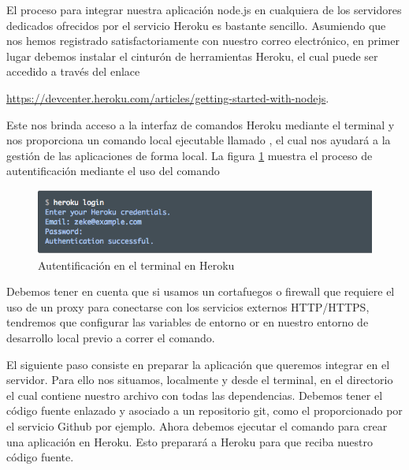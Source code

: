 
\pagestyle{fancy}
\fancyhead[LE,RO]{\thepage}
\fancyhead[LO]{\nouppercase{\rightmark}}
   
   El proceso para integrar nuestra aplicación node.js en cualquiera de los servidores dedicados ofrecidos por el servicio Heroku es bastante sencillo. Asumiendo que nos hemos registrado satisfactoriamente con nuestro correo electrónico, en primer lugar debemos instalar el cinturón de herramientas Heroku, el cual puede ser accedido a través del enlace
   
   \mbox{\url{https://devcenter.heroku.com/articles/getting-started-with-nodejs}}.
    
   Este nos brinda acceso a la interfaz de comandos Heroku mediante el terminal y nos proporciona un comando local ejecutable llamado , el cual nos ayudará a la gestión de las aplicaciones de forma local.
   La figura \ref{fig:authentication} muestra el proceso de autentificación mediante el uso del comando 

 \begin{figure}[H] \centering
    \includegraphics[width=15cm]{graphs/herokuLogin.png} \caption{Autentificación en el terminal en Heroku \cite{heroku}}\label{fig:authentication}
\end{figure}

Debemos tener en cuenta que si usamos un cortafuegos o firewall que requiere el uso de un proxy para conectarse con los servicios externos HTTP/HTTPS, tendremos que configurar las variables de entorno  or  en nuestro entorno de desarrollo local previo a correr el comando.

El siguiente paso consiste en preparar la aplicación que queremos integrar en el servidor. Para ello nos situamos, localmente y desde el terminal, en el directorio el cual contiene nuestro archivo  con todas las dependencias. Debemos tener el código fuente enlazado y asociado a un repositorio git, como el proporcionado por el servicio Github por ejemplo. Ahora debemos ejecutar el comando  para crear una aplicación en Heroku. Esto preparará a Heroku para que reciba nuestro código fuente. 

